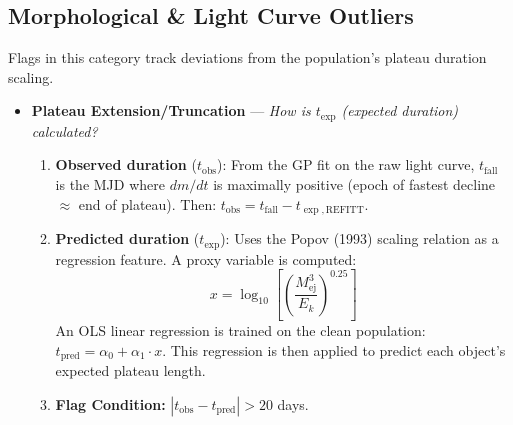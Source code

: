 \documentclass[11pt,a4paper]{article}
\begin{document}
\subsection*{Morphological \& Light Curve Outliers}
Flags in this category track deviations from the population's plateau duration scaling.
\begin{itemize}
    \item \textbf{Plateau Extension/Truncation} --- \textit{How is $t_{\exp}$ (expected duration) calculated?}
    \begin{enumerate}
        \item \textbf{Observed duration} ($t_{\text{obs}}$): From the GP fit on the raw light curve, $t_{\text{fall}}$ is the MJD where $dm/dt$ is maximally positive (epoch of fastest decline $\approx$ end of plateau). Then: $t_{\text{obs}} = t_{\text{fall}} - t_{\exp,\text{REFITT}}$.
        \item \textbf{Predicted duration} ($t_{\exp}$): Uses the Popov (1993) scaling relation as a regression feature. A proxy variable is computed:
        $$x = \log_{10}\!\left[\left(\frac{M_{\text{ej}}^3}{E_k}\right)^{0.25}\right]$$
        An OLS linear regression is trained on the clean population: $t_{\text{pred}} = \alpha_0 + \alpha_1 \cdot x$. This regression is then applied to predict each object's expected plateau length.
        \item \textbf{Flag Condition:} $|t_{\text{obs}} - t_{\text{pred}}| > 20$ days.
    \end{enumerate}
\end{itemize}
\end{document}
